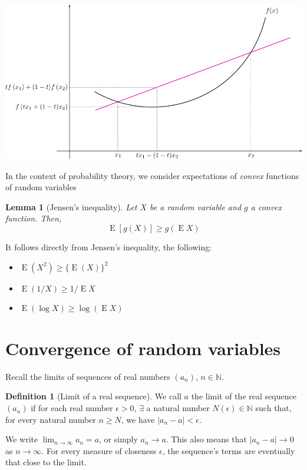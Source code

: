 \documentclass[
]{book}
\providecommand{\tightlist}{%
  \setlength{\itemsep}{0pt}\setlength{\parskip}{0pt}}
\DeclareMathOperator{\E}{E}
\newcommand{\bbN}{\mathbb{N}}
\newtheorem{lemma}{Lemma}[chapter]
\theoremstyle{definition}
\newtheorem{definition}{Definition}[chapter]
\theoremstyle{definition}
\theoremstyle{definition}
\theoremstyle{definition}
\theoremstyle{remark}
\begin{document}
\begin{center}\includegraphics[width=0.8\linewidth]{figure/01-jensen} \end{center}

In the context of probability theory, we consider expectations of \emph{convex} functions of random variables

\begin{lemma}[Jensen's inequality]
Let \(X\) be a random variable and \(g\) a convex function. Then, \[\E\left[g(X) \right] \geq g\left(\E X \right)\]
\end{lemma}

It follows directly from Jensen's inequality, the following:

\begin{itemize}
\tightlist
\item
  \(\E(X^2) \geq \{\E(X)\}^2\)
\item
  \(\E(1/X) \geq 1 / \E X\)
\item
  \(\E(\log X) \geq \log (\E X)\)
\end{itemize}

\hypertarget{convergence-of-random-variables}{%
\section{Convergence of random variables}\label{convergence-of-random-variables}}

Recall the limits of sequences of real numbers \((a_n)\), \(n\in\bbN\).

\begin{definition}[Limit of a real sequence]
We call \(a\) the limit of the real sequence \((a_n)\) if for each real
number \(\epsilon>0\), \(\exists\) a natural number \(N(\epsilon)\in\bbN\) such that, for
every natural number \(n\geq N\), we have \(|a_n-a| < \epsilon\).
\end{definition}

We write \(\lim_{n\to\infty} a_n = a\), or simply \(a_n \to a\). This also
means that \(|a_n-a| \to 0\) as \(n\to\infty\). For every measure of
closeness \(\epsilon\), the sequence's terms are eventually that close to
the limit.
\end{document}
